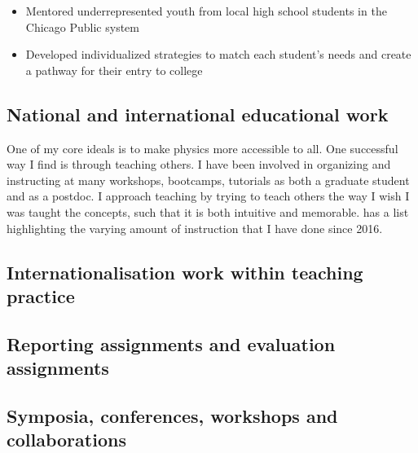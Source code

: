 \begin{itemize}
	\item Mentored underrepresented youth from local high school students in the Chicago Public system
	\item Developed individualized strategies to match each student's needs and create a pathway for their entry to college
\end{itemize}

\subsection{National and international educational work \noneyet}\label{ssec:national-and-international-educational-work-noneyet}

One of my core ideals is to make physics more accessible to all. One successful way I find is through teaching others. I have been involved in organizing and instructing at many workshops, bootcamps, tutorials as both a graduate student and as a postdoc. I approach teaching by trying to teach others the way I wish I was taught the concepts, such that it is both intuitive and memorable.  has a list highlighting the varying amount of instruction that I have done since 2016.

\subsection{Internationalisation work within teaching practice \noneyet}\label{ssec:internationalisation-work-within-teaching-practice-noneyet}
\subsection{Reporting assignments and evaluation assignments \noneyet}\label{ssec:reporting-assignments-and-evaluation-assignments-noneyet}
\subsection{Symposia, conferences, workshops and collaborations}\label{ssec:symposia-conferences-workshops-and-collaborations}

